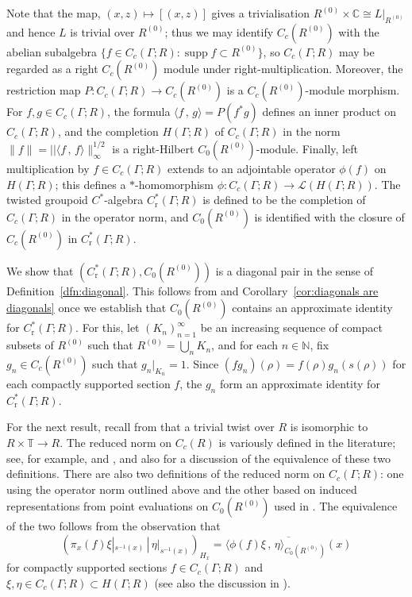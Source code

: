 \documentclass[12pt,a4paper]{amsart}
\newcommand{\field}[1]{\mathbb{#1}}
\newcommand{\CC}{\field{C}}
\newcommand{\NN}{\field{N}}
\newcommand{\TT}{\field{T}}
\newcommand{\Ll}{\mathcal{L}}
\newcommand{\supp}{\operatorname{supp}}
\newcommand{\red}{\operatorname{r}}
\newcommand{\tgcsa}[2]{\ensuremath{C^*_{\red}(#1 ; #2)}}
\begin{document}
Note that the map, $(x, z) \mapsto [(x, z)]$ gives a
trivialisation $R^{(0)} \times \CC \cong L|_{R^{(0)}}$ and hence
$L$ is trivial over $R^{(0)}$; thus we may identify
$C_c(R^{(0)})$ with the abelian subalgebra $\{f\in C_c(\Gamma;
R):\supp f\subset R^{(0)}\}$, so  $C_c(\Gamma; R)$ may be
regarded as a right $C_c(R^{(0)})$ module under
right-multiplication. Moreover, the restriction map
$P:C_c(\Gamma; R)\to C_c(R^{(0)})$  is a $C_c(R^{(0)})$-module
morphism. For $f,g\in C_c(\Gamma; R)$, the formula $\langle
f\,,\, g\rangle =P(f^*g)$ defines an inner product on
$C_c(\Gamma; R)$, and the completion  $H(\Gamma; R)$ of
$C_c(\Gamma; R)$ in the norm $\|f\|=||\langle f\,,\,
f\rangle\|_\infty^{1/2}$  is a right-Hilbert
$C_0(R^{(0)})$-module.  Finally,  left multiplication by $f\in
C_c(\Gamma; R)$ extends to an adjointable operator $\phi(f)$ on
$H(\Gamma; R)$; this defines a $*$-homomorphism $\phi :
C_c(\Gamma; R) \to \Ll (H(\Gamma; R))$. The twisted groupoid
$C^*$-algebra \tgcsa{\Gamma}{R} is defined to be the completion
of $C_c(\Gamma; R)$ in the operator norm, and $C_0(R^{(0)})$ is
identified with the closure of $C_c(R^{(0)})$ in
$\tgcsa{\Gamma}{R}$.

We show that $(\tgcsa{\Gamma}{R}, C_0(R^{(0)}))$ is a diagonal
pair in the sense of Definition~\ref{dfn:diagonal}. This follows
from \cite[Proposition~2.9]{Kumjian1986} and
Corollary~\ref{cor:diagonals are diagonals} once we establish
that $C_0(R^{(0)})$ contains an approximate identity for
$\tgcsa{\Gamma}{R}$. For this, let $(K_n)^\infty_{n=1}$ be an
increasing sequence of compact subsets of $R^{(0)}$ such that
$R^{(0)}=\bigcup_n K_n$, and for each $n \in \NN$, fix $g_n\in
C_c(R^{(0)})$ such that $g_n|_{K_n} = 1$.  Since
$(fg_n)(\rho)=f(\rho)g_n(s(\rho))$ for each compactly supported
section $f$, the $g_n$ form an approximate identity for
\tgcsa{\Gamma}{R}.

For the next result, recall from \cite[Remark~4.2]{Kumjian1988}
that a trivial twist over $R$ is isomorphic to $R \times \TT \to
R$.   The reduced norm on $C_c(R)$ is variously defined in the
literature; see, for example, \cite[p.~82]{Renault1980} and
\cite[p.~146]{ADR}, and also \cite[\S{3}]{sims-williams} for a
discussion of the equivalence of these two definitions. There
are also two definitions of the reduced norm on $C_c(\Gamma;R)$:
one using the operator norm outlined above and the other based
on  induced representations from point evaluations on
$C_0(R^{(0)})$  used in \cite[p.~40]{Renault2008}. The
equivalence of the two follows from the observation  that
\[
    (\pi_x(f)\xi|_{s^{-1}(x)} \,|\, \eta|_{s^{-1}(x)})_{H_x}
        = \overline{\langle \phi(f)\xi\,,\, \eta\rangle_{C_0(R^{(0)})}(x)}
\]
for compactly supported sections $f\in C_c(\Gamma;R)$ and
$\xi,\eta\in C_c(\Gamma;R)\subset H(\Gamma;R)$ (see also the
discussion in  \cite[p.~40]{Renault2008}).
\end{document}
